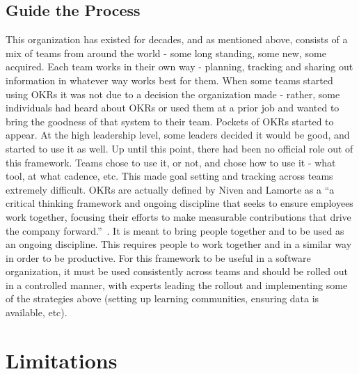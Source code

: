 \documentclass[sigconf, nonacm]{acmart}
\begin{document}
\subsection{Guide the Process}
This organization has existed for decades, and as mentioned above, consists of a mix of teams from around the world - some long standing, some new, some acquired. Each team works in their own way - planning, tracking and sharing out information in whatever way works best for them. When some teams started using OKRs it was not due to a decision the organization made - rather, some individuals had heard about OKRs or used them at a prior job and wanted to bring the goodness of that system to their team. Pockets of OKRs started to appear. At the high leadership level, some leaders decided it would be good, and started to use it as well. Up until this point, there had been no official role out of this framework. Teams chose to use it, or not, and chose how to use it - what tool, at what cadence, etc. This made goal setting and tracking across teams extremely difficult. OKRs are actually defined by Niven and Lamorte as a ``a critical thinking framework and ongoing discipline that seeks to ensure employees work together, focusing their efforts to make measurable contributions that drive the company forward.''~\cite{lamorte}. It is meant to bring people together and to be used as an ongoing discipline. This requires people to work together and in a similar way in order to be productive. For this framework to be useful in a software organization, it must be used consistently across teams and should be rolled out in a controlled manner, with experts leading the rollout and implementing some of the strategies above (setting up learning communities, ensuring data is available, etc).


\section{Limitations}
\end{document}
